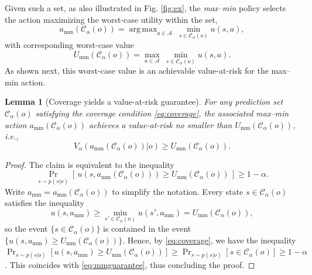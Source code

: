 \documentclass[journal]{IEEEtran}
\newtheorem{lemma}{Lemma}
\theoremstyle{definition}
\theoremstyle{remark}
\newcommand{\Aset}{\mathcal{A}}
\DeclareMathOperator*{\argmax}{arg\,max}
\begin{document}
Given such a set, as also illustrated in Fig. \ref{fig:ex}, the \emph{max--min} policy selects the action maximizing
the worst-case utility within the set,
\begin{equation}
\label{eq:maxmin}
a_{\mathrm{mm}}(\mathcal{C}_{\alpha}(o))=\argmax_{a\in\Aset}\ \min_{s\in \mathcal{C}_{\alpha}(o)}u(s,a),
\end{equation}
with corresponding worst-case value
\begin{equation}
\label{eq:umm}
U_{\mathrm{mm}}(\mathcal{C}_{\alpha}(o))=\max_{a\in\Aset}\ \min_{s\in \mathcal{C}_{\alpha}(o)}u(s,a).
\end{equation}
As shown next, this worst-case value is an achievable value-at-risk for the
max--min action.


\begin{lemma}[Coverage yields a value-at-risk guarantee]
\label{lem:guarantee}
For any prediction set $\mathcal{C}_{\alpha}(o)$ satisfying the coverage
condition \eqref{eq:coverage}, the associated max--min action
$a_{\mathrm{mm}}(\mathcal{C}_{\alpha}(o))$ achieves a value-at-risk no smaller
than $U_{\mathrm{mm}}(\mathcal{C}_{\alpha}(o))$, i.e.,
\begin{equation}
V_\alpha\!\left(a_{\mathrm{mm}}(\mathcal{C}_{\alpha}(o))| o\right)\ge U_{\mathrm{mm}}(\mathcal{C}_{\alpha}(o)).
\end{equation}
\end{lemma}
\begin{proof}
The claim is equivalent to the inequality
\begin{equation}
\label{eq:mmguarantee}
\Pr_{s\sim p(s| o)}\!\left[\,u\!\left(s,a_{\mathrm{mm}}(\mathcal{C}_{\alpha}(o))\right)\ge U_{\mathrm{mm}}(\mathcal{C}_{\alpha}(o))\,\right]\ge 1-\alpha.
\end{equation}
Write $a_{\mathrm{mm}}=a_{\mathrm{mm}}(\mathcal{C}_{\alpha}(o))$ to simplify the notation. Every
state $s\in \mathcal{C}_{\alpha}(o)$ satisfies the inequality 
\begin{equation} u(s,a_{\mathrm{mm}})\ge\min_{s'\in \mathcal{C}_{\alpha}(o)}u(s',a_{\mathrm{mm}})=U_{\mathrm{mm}}(\mathcal{C}_{\alpha}(o)),\end{equation}
so the event $\{s\in \mathcal{C}_{\alpha}(o)\}$ is contained in the event 
$\{u(s,a_{\mathrm{mm}})\ge U_{\mathrm{mm}}(\mathcal{C}_{\alpha}(o))\}$. Hence, by
\eqref{eq:coverage}, we have the inequality 
$\Pr_{s\sim p(s|o)}[u(s,a_{\mathrm{mm}})\ge U_{\mathrm{mm}}(\mathcal{C}_{\alpha}(o))]\ge\Pr_{s\sim p(s|o)}[s\in \mathcal{C}_{\alpha}(o)]\ge 1-\alpha$. This coincides with \eqref{eq:mmguarantee}, thus concluding the proof. 
\end{proof}
\end{document}
